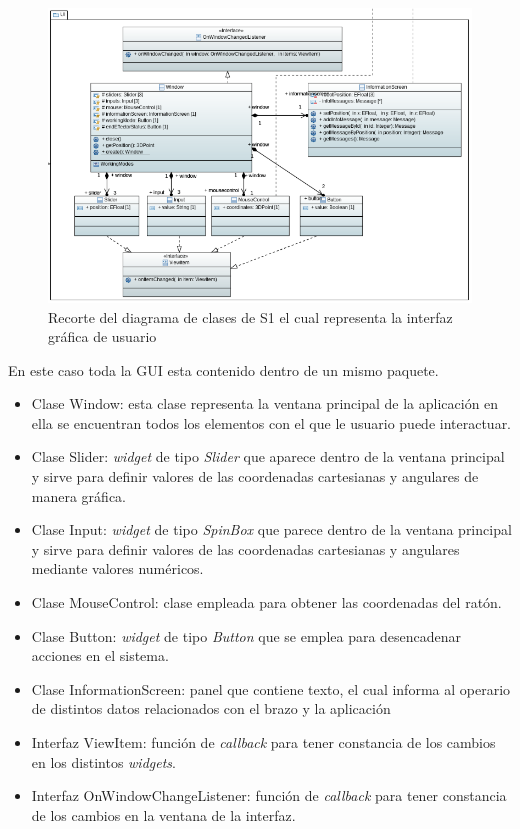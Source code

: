 \begin{figure}[H]
    \centering
    \includegraphics[width=\linewidth]{pictures/S1ClassDiagramGUI.PNG}
    \caption{Recorte del diagrama de clases de \ac{S1} el cual representa la interfaz gráfica de usuario}
    \label{fig:diagrama_clases_GUI_s1}
\end{figure}

En este caso toda la GUI esta contenido dentro de un mismo paquete.

\begin{itemize}
    \item Clase Window: esta clase representa la ventana principal de la aplicación en ella se encuentran todos los elementos con el que le usuario puede interactuar.
    \item Clase Slider: \textit{widget} de tipo \textit{Slider} que aparece dentro de la ventana principal y sirve para definir valores de las coordenadas cartesianas y angulares de manera gráfica.
    \item Clase Input: \textit{widget} de tipo \textit{SpinBox} que parece dentro de la ventana principal y sirve para definir valores de las coordenadas cartesianas y angulares mediante valores numéricos.
    \item Clase MouseControl: clase empleada para obtener las coordenadas del ratón.
    \item Clase Button: \textit{widget} de tipo \textit{Button} que se emplea para desencadenar acciones en el sistema.
    \item Clase InformationScreen: panel que contiene texto, el cual informa al operario de distintos datos relacionados con el brazo y la aplicación
    \item Interfaz ViewItem: función de \textit{callback} para tener constancia de los cambios en los distintos \textit{widgets}.
    \item Interfaz OnWindowChangeListener: función de \textit{callback} para tener constancia de los cambios en la ventana de la interfaz.
\end{itemize}


